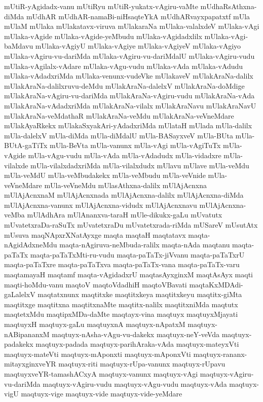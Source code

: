 {mUtiR-yAgidadx-vanu
mUtiRyu
mUtiR-yukatx-vAgiru-vaMte
mUdhaRsAthxna-diMda
mUdhAR
mUdhAR-namaBi-niHsaqteYkA
mUdhARvayxpapatxtf
mUla
mUlaM
mUlaka
mUlakatavx-viruva
mUlakaraNa
mUlaka-valalxdeV
mUlaka-vAgi
mUlaka-vAgide
mUlaka-vAgide-yeMbudu
mUlaka-vAgidadxlilx
mUlaka-vAgi-baMdavu
mUlaka-vAgiyU
mUlaka-vAgiye
mUlaka-vAgiyeV
mUlaka-vAgiyo
mUlaka-vAgiru-vu-dariMda
mUlaka-vAgiru-vu-dariMdalU
mUlaka-vAgiru-vudu
mUlaka-vAgilalx-vAdare
mUlaka-vAgu-vudu
mUlaka-vAda
mUlaka-vAdudu
mUlaka-vAdadxriMda
mUlaka-venunx-vudeVke
mUlakaveV
mUlakAraNa-dalilx
mUlakAraNa-dalilxruvu-deMdu
mUlakAraNa-dalelxV
mUlakAraNa-doMdige
mUlakAraNa-vAgiru-vu-dariMda
mUlakAraNa-vAgiru-vudu
mUlakAraNa-vAda
mUlakAraNa-vAdadxriMda
mUlakAraNa-vilalx
mUlakAraNavu
mUlakAraNavU
mUlakAraNa-veMdathaR
mUlakAraNa-veMdu
mUlakAraNa-veVneMdare
mUlakAyaRkekx
mUlakaSxyakAri-yAdadxriMda
mUlataH
mUlada
mUla-dalilx
mUla-dalelxV
mUla-diMda
mUla-diMdalU
mUla-BASayxveV
mUla-BUta
mUla-BUtA-gaTiTx
mUla-BeVta
mUla-vanunx
mUla-vAgi
mUla-vAgiTuTx
mUla-vAgide
mUla-vAgu-vudu
mUla-vAda
mUla-vAdadudx
mUla-vidadxre
mUla-vilalxde
mUla-vilalxdadxriMda
mUla-vilalxdudx
mUlavu
mUlave
mUla-veMdu
mUla-veMdU
mUla-veMbudakekx
mUla-veMbudu
mUla-veVnide
mUla-veVneMdare
mUla-veVneMdu
mUlasAthxna-dalilx
mUlAjAcnxna
mUlAjAcnxnaM
mUlAjAcnxnada
mUlAjAcnxna-dalilx
mUlAjAcnxna-diMda
mUlAjAcnxna-vanunx
mUlAjAcnxna-vidudx
mUlAjAcnxnavu
mUlAjAcnxna-veMba
mUlAdhAra
mUlAnanxva-taraH
mUle-dikukx-gaLu
mUvatutx
mUvatetxraDa-raSuTx
mUvatetxraDu
mUvatetxrada-riMda
mUSareV
mUsutAtx
mUsuva
maqNApxrXNatAyxge
maqta
maqtaH
maqtatavx
maqta-nAgidAdxneMdu
maqta-nAgiruva-neMbuda-ralilx
maqta-nAda
maqtanu
maqta-paTaTx
maqta-paTaTxMti-ru-vudu
maqta-paTaTx-jiVvanu
maqta-paTaTxrU
maqta-paTaTxre
maqta-paTaTxva
maqta-paTaTx-vana
maqta-paTaTx-varu
maqtamayaH
maqtamf
maqta-vAgidadxrU
maqtasAyxginxM
maqtAsAyx
maqti
maqti-hoMdu-vanu
maqtoV
maqtoVdadhiH
maqtoVBavati
maqtaKxMDAdi-gaLalelxV
maqtatxnunx
maqtitxke
maqtitxkeya
maqtitxkeyu
maqtitx-giMta
maqtitxge
maqtitxna
maqtitxnaMte
maqtitx-nalilx
maqtitxniMda
maqtutx
maqtetxMdu
maqtipxMDa-daMte
maqtayx-vina
maqtuyx
maqtuyxMjayati
maqtuyxH
maqtuyx-gaLu
maqtuyxnA
maqtuyx-nApatxM
maqtuyx-nABipananxM
maqtuyx-nAsha-vAgu-vu-dakekx
maqtuyx-neY-veVda
maqtuyx-padakekx
maqtuyx-padada
maqtuyx-parihAraka-vAda
maqtuyx-mateyxVti
maqtuyx-mateVti
maqtuyx-mAponxti
maqtuyx-mAponxVti
maqtuyx-rananx-mitayxginxveYR
maqtuyx-riti
maqtuyx-rUpa-vanunx
maqtuyx-rUpavu
maqtuyxveYR-tamashACxyA
maqtuyx-vanunx
maqtuyx-vAgi
maqtuyx-vAgiru-vu-dariMda
maqtuyx-vAgiru-vudu
maqtuyx-vAgu-vudu
maqtuyx-vAda
maqtuyx-vigU
maqtuyx-vige
maqtuyx-vide
maqtuyx-vide-yeMdare
}

